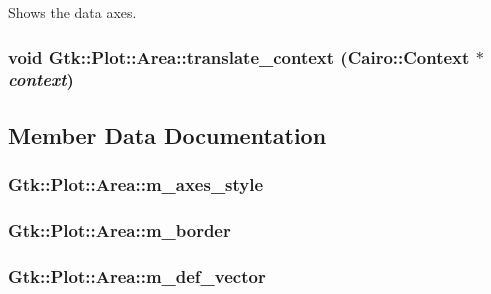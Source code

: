 Shows the data axes. \hypertarget{classGtk_1_1Plot_1_1Area_a2be35b990f15d351739af58119d5e7a9}{
\subsubsection[{translate\_\-context}]{\setlength{\rightskip}{0pt plus 5cm}void Gtk::Plot::Area::translate\_\-context (Cairo::Context $\ast$ {\em context})}}
\label{classGtk_1_1Plot_1_1Area_a2be35b990f15d351739af58119d5e7a9}


\subsection{Member Data Documentation}
\hypertarget{classGtk_1_1Plot_1_1Area_a46e921e38d4f06b75fa733ead0e3e153}{
\subsubsection[{m\_\-axes\_\-style}]{ {\bf Gtk::Plot::Area::m\_\-axes\_\-style}}}
\label{classGtk_1_1Plot_1_1Area_a46e921e38d4f06b75fa733ead0e3e153}
\hypertarget{classGtk_1_1Plot_1_1Area_a64ed564fa355d20fa2e85c39bf681505}{
\subsubsection[{m\_\-border}]{ {\bf Gtk::Plot::Area::m\_\-border}}}
\label{classGtk_1_1Plot_1_1Area_a64ed564fa355d20fa2e85c39bf681505}
\hypertarget{classGtk_1_1Plot_1_1Area_acca72f1dfcaf243905f2f2a72383a0a6}{
\subsubsection[{m\_\-def\_\-vector}]{ {\bf Gtk::Plot::Area::m\_\-def\_\-vector}}}
